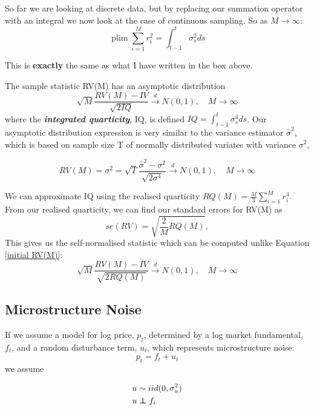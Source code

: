 \documentclass[11pt]{article}
\begin{document}
So far we are looking at discrete data, but by replacing our summation operator with an integral we now look at the case of continuous sampling. So as $M\rightarrow\infty$:
\[\operatorname{plim}\sum_{i=1}^M r_i^2 = \int_{t-1}^t \sigma_s^2 ds\]
\begin{note}
    This is \textbf{exactly} the same as what I have written in the box above.
\end{note}

The sample statistic RV(M) has an asymptotic distribution
\begin{equation}
\label{initial RV(M)}
\sqrt{M} \frac{R V(M)-I V}{\sqrt{2 I Q}} \stackrel{d}{\rightarrow} N(0,1), \quad M\rightarrow\infty
\end{equation}
where the \textbf{\textit{integrated quarticity}}, IQ, is defined $IQ = \int_{t-1}^t \sigma_s^4 ds$. Our asymptotic distribution expression is very similar to the variance estimator $\hat{\sigma}^2$, which is based on sample size T of normally distributed variates with variance $\sigma^2$,

\[RV(M) = \sigma^2 = \sqrt{T}\dfrac{\hat{\sigma}^2-\sigma^2}{\sqrt{2\sigma^4}}\overset{d}{\rightarrow}N(0,1), \quad M\rightarrow\infty\]

We can approximate IQ using the realised quarticity $RQ(M) = \frac{M}{3}\sum_{i=1}^M r_i^4$. From our realised quarticity, we can find our standard errors for RV(M) as
\[se(RV) = \sqrt{\dfrac{2}{M}RQ(M)},\]
This gives us the self-normalised statistic which can be computed unlike Equation \eqref{initial RV(M)}:
\begin{equation}
    \label{RV asymptotic}
    \sqrt{M}\dfrac{RV(M) - IV}{\sqrt{2RQ(M)}}\overset{d}{\rightarrow}N(0,1), \quad M\rightarrow\infty
\end{equation}

\subsection{Microstructure Noise}

If we assume a model for log price, $p_t$, determined by a log market fundamental, $f_t$, and a random disturbance term, $u_t$, which represents microstructure noise:
\begin{equation}
    \label{microstructure initial}
    p_t = f_t + u_t
\end{equation}
we assume 
\begin{mdframed}
    \begin{align*}
        u &\sim iid(0,\sigma_u^2) \\
        u & \indep f_i     
    \end{align*}
\end{mdframed}
\end{document}
